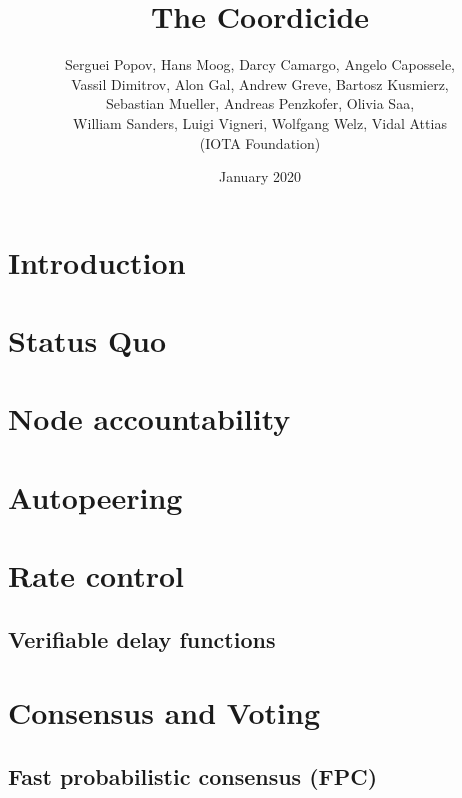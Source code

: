 \documentclass{article}
\title{The Coordicide}
\author{Serguei Popov, Hans Moog, Darcy Camargo, Angelo Capossele, \\ Vassil Dimitrov, 
Alon Gal,  Andrew Greve, Bartosz Kusmierz, \\ Sebastian Mueller,   Andreas Penzkofer, Olivia Saa, \\  William Sanders,  Luigi Vigneri, Wolfgang Welz, Vidal Attias 
\\
(IOTA Foundation)}
\date{January 2020}
\newcommand{\1}[1]{\mathbf{1}\{#1\}}
\begin{document}
\maketitle


{\small
\tableofcontents
}
\clearpage

\glsaddall
\printglossary[nonumberlist, nogroupskip=true]\label{sec:glossary}
\printacronyms[nonumberlist, nogroupskip=true]
\clearpage

\section{Introduction}

\pagebreak

\section{Status Quo}\label{sec:cliri}

\pagebreak

\section{Node accountability}\label{sec:node_acc}

\pagebreak

\section{Autopeering}\label{sec:peering}

\pagebreak

\section{Rate control}\label{sec:rate_control}


\subsection{Verifiable delay functions}\label{sec:vdf}

\clearpage
\pagebreak

\section{Consensus and Voting}\label{sec:consensus}


\subsection{Fast probabilistic consensus (FPC)}

\end{document}
